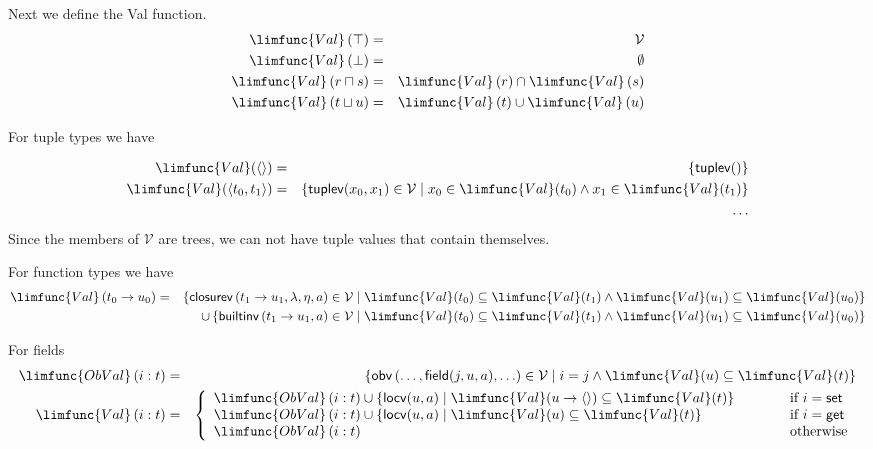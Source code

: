 \documentclass[12pt]{article}
\begin{document}
Next we define the Val function.%
\begin{eqnarray*}
\limfunc{Val}\left( \top \right) &=&\mathcal{V} \\
\limfunc{Val}\left( \bot \right) &=&\emptyset \\
\limfunc{Val}\left( r\sqcap s\right) &=&\limfunc{Val}\left( r\right) \cap 
\limfunc{Val}\left( s\right) \\
\limfunc{Val}\left( t\sqcup u\right) &=&\limfunc{Val}\left( t\right) \cup 
\limfunc{Val}\left( u\right)
\end{eqnarray*}

For tuple types we have

\begin{eqnarray*}
\limfunc{Val}(\left\langle {}\right\rangle ) &=&\left\{ \mathsf{tuplev()}%
\right\} \\
\limfunc{Val}(\left\langle t_{0},t_{1}\right\rangle ) &=&\left\{ \mathsf{%
tuplev}(x_{0},x_{1})\in \mathcal{V}\mid x_{0}\in \limfunc{Val}(t_{0})\wedge
x_{1}\in \limfunc{Val}(t_{1})\right\} \\
&&\ldots
\end{eqnarray*}%
Since the members of $\mathcal{V}$ are trees, we can not have tuple values
that contain themselves.

For function types we have%
\begin{eqnarray*}
\limfunc{Val}\left( t_{0}\rightarrow u_{0}\right) &=&\left\{ \mathsf{closurev%
}\left( t_{1}\rightarrow u_{1},\lambda ,\eta ,a\right) \in \mathcal{V}\mid 
\limfunc{Val}(t_{0})\subseteq \limfunc{Val}(t_{1})\wedge \limfunc{Val}%
(u_{1})\subseteq \limfunc{Val}(u_{0})\right\} \\
&&\cup \left\{ \mathsf{builtinv}\left( t_{1}\rightarrow u_{1},a\right) \in 
\mathcal{V}\mid \limfunc{Val}(t_{0})\subseteq \limfunc{Val}(t_{1})\wedge 
\limfunc{Val}(u_{1})\subseteq \limfunc{Val}(u_{0})\right\}
\end{eqnarray*}

For fields%
\begin{eqnarray*}
\limfunc{ObVal}\left( i:t\right)  &=&\left\{ \mathsf{obv}\left( \ldots ,%
\mathsf{field}(j,u,a),\ldots \right) \in \mathcal{V}\mid i=j\wedge \limfunc{%
Val}(u)\subseteq \limfunc{Val}(t)\right\}  \\
\limfunc{Val}\left( i:t\right)  &=&\left\{ 
\begin{array}{lll}
\limfunc{ObVal}\left( i:t\right) \cup \left\{ \mathsf{locv}(u,a)\mid 
\limfunc{Val}(u\rightarrow \left\langle {}\right\rangle )\subseteq \limfunc{%
Val}(t)\right\}  & \qquad  & \text{if }i=\mathsf{set} \\ 
\limfunc{ObVal}\left( i:t\right) \cup \left\{ \mathsf{locv}(u,a)\mid 
\limfunc{Val}(u)\subseteq \limfunc{Val}(t)\right\}  &  & \text{if }i=\mathsf{%
get} \\ 
\limfunc{ObVal}\left( i:t\right)  &  & \text{otherwise}%
\end{array}%
\right. 
\end{eqnarray*}
\end{document}
